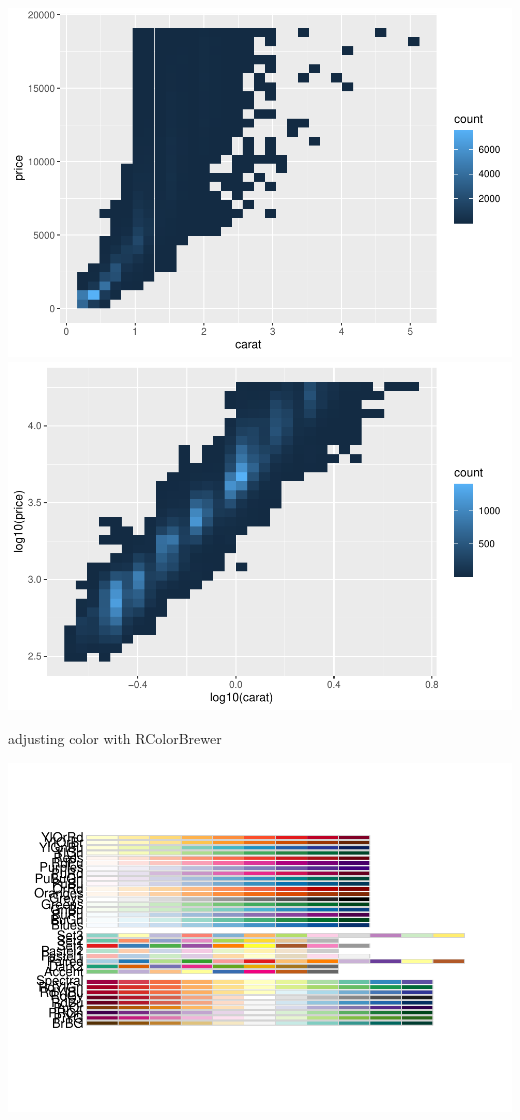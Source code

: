 \documentclass[
]{article}
\begin{document}
\includegraphics{rmarkdown_tutorial_files/figure-latex/unnamed-chunk-24-1.pdf}
\includegraphics{rmarkdown_tutorial_files/figure-latex/unnamed-chunk-24-2.pdf}

adjusting color with RColorBrewer

\includegraphics{rmarkdown_tutorial_files/figure-latex/unnamed-chunk-25-1.pdf}
\end{document}
